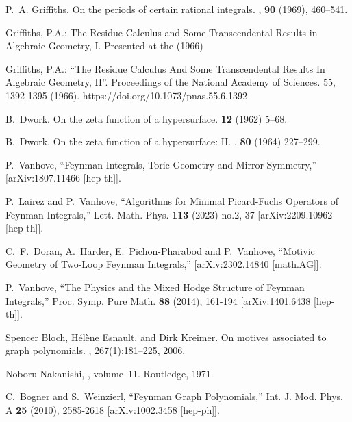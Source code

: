 \documentclass[a4paper,12pt]{article}
\numberwithin{equation}{section}
\numberwithin{figure}{section}
\begin{document}
\begin{thebibliography}{99}
P.~A. Griffiths.
\newblock On the periods of certain rational integrals.
, {\bf 90} (1969), 460--541.


   Griffiths, P.A.: The Residue Calculus and Some
    Transcendental Results in Algebraic Geometry, I. Presented at the
    (1966)

    Griffiths, P.A.: ``The Residue Calculus And Some Transcendental
    Results In Algebraic Geometry, II''. Proceedings of the National
    Academy of Sciences. 55, 1392-1395
    (1966). https://doi.org/10.1073/pnas.55.6.1392 

B.~Dwork.
\newblock On the zeta function of a hypersurface.
 {\bf 12} (1962) 5--68.

B.~Dwork.
\newblock On the zeta function of a hypersurface: {{II}}.
, {\bf 80} (1964) 227--299.
  
P.~Vanhove,
``Feynman Integrals, Toric Geometry and Mirror Symmetry,''
[arXiv:1807.11466 [hep-th]].
  
P.~Lairez and P.~Vanhove,
``Algorithms for Minimal Picard-Fuchs Operators of Feynman Integrals,''
Lett. Math. Phys. \textbf{113} (2023) no.2, 37
[arXiv:2209.10962 [hep-th]].

C.~F.~Doran, A.~Harder, E.~Pichon-Pharabod and P.~Vanhove,
``Motivic Geometry of Two-Loop Feynman Integrals,''
[arXiv:2302.14840 [math.AG]].

  
P.~Vanhove,
``The Physics and the Mixed Hodge Structure of Feynman Integrals,''
Proc. Symp. Pure Math. \textbf{88} (2014), 161-194
[arXiv:1401.6438 [hep-th]].
  
Spencer Bloch, H{\'e}l{\`e}ne Esnault, and Dirk Kreimer.
\newblock On motives associated to graph polynomials.
,
267(1):181--225, 2006.



Noboru Nakanishi,
, volume~11.
\newblock Routledge, 1971.


C.~Bogner and S.~Weinzierl,
``Feynman Graph Polynomials,''
Int. J. Mod. Phys. A \textbf{25} (2010), 2585-2618
[arXiv:1002.3458 [hep-ph]].


\end{thebibliography}
\end{document}

